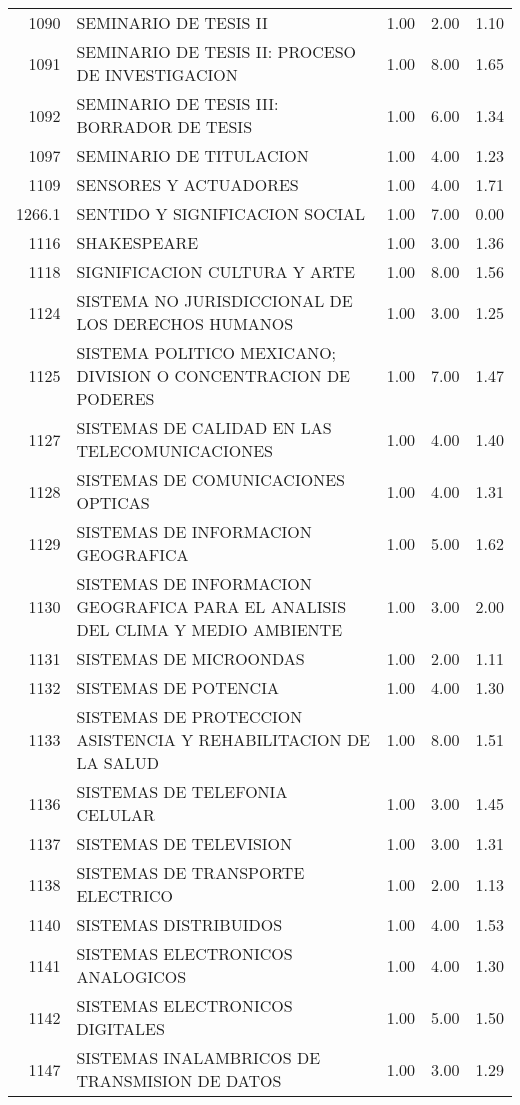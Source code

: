 \documentclass[12pt]{article}
\begin{document}
\begin{table}[ht]
\begin{tabular}{rlrrr}
  1090 & SEMINARIO DE TESIS II & 1.00 & 2.00 & 1.10 \\ 
  1091 & SEMINARIO DE TESIS II: PROCESO DE INVESTIGACION & 1.00 & 8.00 & 1.65 \\ 
  1092 & SEMINARIO DE TESIS III: BORRADOR DE TESIS & 1.00 & 6.00 & 1.34 \\ 
  1097 & SEMINARIO DE TITULACION & 1.00 & 4.00 & 1.23 \\ 
  1109 & SENSORES Y ACTUADORES & 1.00 & 4.00 & 1.71 \\ 
  1266.1 & SENTIDO Y SIGNIFICACION SOCIAL & 1.00 & 7.00 & 0.00 \\ 
  1116 & SHAKESPEARE & 1.00 & 3.00 & 1.36 \\ 
  1118 & SIGNIFICACION CULTURA Y ARTE & 1.00 & 8.00 & 1.56 \\ 
  1124 & SISTEMA NO JURISDICCIONAL DE LOS DERECHOS HUMANOS & 1.00 & 3.00 & 1.25 \\ 
  1125 & SISTEMA POLITICO MEXICANO; DIVISION O CONCENTRACION DE PODERES & 1.00 & 7.00 & 1.47 \\ 
  1127 & SISTEMAS DE CALIDAD EN LAS TELECOMUNICACIONES & 1.00 & 4.00 & 1.40 \\ 
  1128 & SISTEMAS DE COMUNICACIONES OPTICAS & 1.00 & 4.00 & 1.31 \\ 
  1129 & SISTEMAS DE INFORMACION GEOGRAFICA & 1.00 & 5.00 & 1.62 \\ 
  1130 & SISTEMAS DE INFORMACION GEOGRAFICA PARA EL ANALISIS DEL CLIMA Y MEDIO AMBIENTE & 1.00 & 3.00 & 2.00 \\ 
  1131 & SISTEMAS DE MICROONDAS & 1.00 & 2.00 & 1.11 \\ 
  1132 & SISTEMAS DE POTENCIA & 1.00 & 4.00 & 1.30 \\ 
  1133 & SISTEMAS DE PROTECCION ASISTENCIA Y REHABILITACION DE LA SALUD & 1.00 & 8.00 & 1.51 \\ 
  1136 & SISTEMAS DE TELEFONIA CELULAR & 1.00 & 3.00 & 1.45 \\ 
  1137 & SISTEMAS DE TELEVISION & 1.00 & 3.00 & 1.31 \\ 
  1138 & SISTEMAS DE TRANSPORTE ELECTRICO & 1.00 & 2.00 & 1.13 \\ 
  1140 & SISTEMAS DISTRIBUIDOS & 1.00 & 4.00 & 1.53 \\ 
  1141 & SISTEMAS ELECTRONICOS ANALOGICOS & 1.00 & 4.00 & 1.30 \\ 
  1142 & SISTEMAS ELECTRONICOS DIGITALES & 1.00 & 5.00 & 1.50 \\ 
  1147 & SISTEMAS INALAMBRICOS DE TRANSMISION DE DATOS & 1.00 & 3.00 & 1.29 \\ 

\end{tabular}
\end{table}
\end{document}

